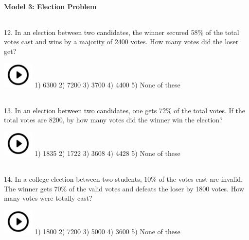 \documentclass{article}
\begin{document}
\noindent 

\noindent 

\noindent \textbf{\\ Model 3: Election Problem \\}

\noindent 

\noindent \\ 12. In an election between two candidates, the winner secured 58\% of the total votes cast and wins by a majority of 2400 votes. How many votes did the loser get?

\noindent \includegraphics*[width=0.61in, height=0.52in]{images/image1} 1) 6300                    2) 7200             3) 3700             4) 4400             5) None of these

\noindent 

\noindent 

\noindent 

\noindent \\ 13. In an election between two candidates, one gets 72\% of the total votes. If the total votes are 8200, by how many votes did the winner win the election?

\noindent 

\noindent \includegraphics*[width=0.61in, height=0.52in]{images/image1} 1) 1835                    2) 1722             3) 3608             4) 4428             5) None of these

\noindent \\ 14.  In a college election between two students, 10\% of the votes cast are invalid. The winner gets 70\% of the valid votes and defeats the loser by 1800 votes. How many votes were totally cast?

\noindent 

\noindent \includegraphics*[width=0.61in, height=0.52in]{images/image1} 1) 1800                    2) 7200             3) 5000             4) 3600             5) None of these
\end{document}
